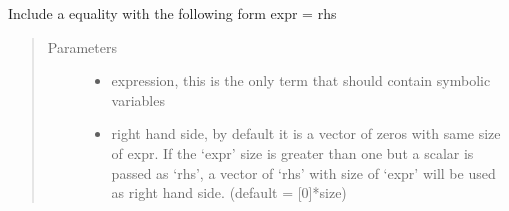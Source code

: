 \documentclass[letterpaper,10pt,english]{sphinxmanual}
\begin{document}
\begin{fulllineitems}
\begin{fulllineitems}
\label{\detokenize{yaocptool.optimization:yaocptool.optimization.abstract_optimization_problem.AbstractOptimizationProblem.get_default_call_dict}}
\end{fulllineitems}


\begin{fulllineitems}
\label{\detokenize{yaocptool.optimization:yaocptool.optimization.abstract_optimization_problem.AbstractOptimizationProblem.get_problem_dict}}
\end{fulllineitems}


\begin{fulllineitems}
\label{\detokenize{yaocptool.optimization:yaocptool.optimization.abstract_optimization_problem.AbstractOptimizationProblem.get_solver}}
\end{fulllineitems}


\begin{fulllineitems}
\label{\detokenize{yaocptool.optimization:yaocptool.optimization.abstract_optimization_problem.AbstractOptimizationProblem.include_equality}}
Include a equality with the following form
expr = rhs
\begin{quote}\begin{description}
\item[{Parameters}] \leavevmode\begin{itemize}
\item {} 
 \textendash{} expression, this is the only term that should contain symbolic variables

\item {} 
 \textendash{} right hand side, by default it is a vector of zeros with same size of expr. If the  ‘expr’ size is
greater than one but a scalar is passed as ‘rhs’, a vector of ‘rhs’ with size of ‘expr’ will be used as
right hand side. (default = {[}0{]}*size)


\end{itemize}
\end{description}
\end{quote}
\end{fulllineitems}
\end{fulllineitems}
\end{document}
